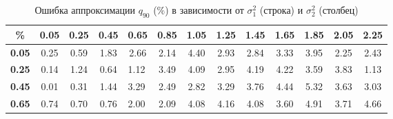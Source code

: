 \documentclass[12pt]{article}
\begin{document}
	\begin{table}[!hhh]
		\caption{Ошибка аппроксимации $q_{90}$ ($\%$) в зависимости от $\sigma_{1}^{2}$ (строка) и $\sigma_{2}^{2}$ (столбец)}
		\label{tab3}
		\begin{tabular}{|c|ccclcccccccc}
			\hline
			\textbf{\%}                         & \multicolumn{1}{c|}{\textbf{0.05}} & \multicolumn{1}{c|}{\textbf{0.25}} & \multicolumn{1}{c|}{\textbf{0.45}} & \multicolumn{1}{l|}{\textbf{0.65}} & \multicolumn{1}{c|}{\textbf{0.85}} & \multicolumn{1}{c|}{\textbf{1.05}} & \multicolumn{1}{c|}{\textbf{1.25}} & \multicolumn{1}{c|}{\textbf{1.45}} & \multicolumn{1}{c|}{\textbf{1.65}} & \multicolumn{1}{c|}{\textbf{1.85}} & \multicolumn{1}{c|}{\textbf{2.05}} & \multicolumn{1}{c|}{\textbf{2.25}} \\ \hline
			\textbf{0.05}                       & 0.25                               & 0.59                               & 1.83                               & \multicolumn{1}{c}{2.66}           & 2.14                               & 4.40                               & 2.93                               & 2.84                               & 3.33                               & 3.95                               & 2.25                               & 2.43                               \\ \cline{1-1}
			\textbf{0.25}                       & 0.14                               & 1.24                               & 0.64                               & 1.12                               & 3.49                               & 4.09                               & 2.95                               & 4.19                               & 4.22                               & 3.59                               & 3.83                               & 1.13                               \\ \cline{1-1}
			\textbf{0.45}                       & 0.01                               & 0.31                               & 1.44                               & 3.29                               & 2.49                               & 2.82                               & 3.29                               & 3.76                               & 4.44                               & 5.32                               & 3.63                               & 3.03                               \\ \cline{1-1}
			\textbf{0.65}                       & 0.74                               & 0.70                               & 0.76                               & 2.00                               & 2.09                               & 4.08                               & 4.16                               & 4.08                               & 3.60                               & 4.91                               & 3.71                               & 4.66                               \\ \cline{1-1}

\end{tabular}
\end{table}
\end{document}
